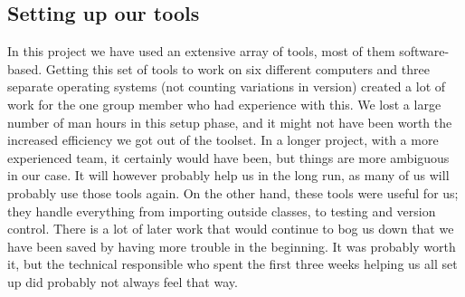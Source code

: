 \subsection{Setting up our tools}
In this project we have used an extensive array of tools, most of them software-based. Getting this set of tools to work on six different computers and three separate operating systems (not counting variations in version) created a lot of work for the one group member who had experience with this.
\newline
\newline
We lost a large number of man hours in this setup phase, and it might not have been worth the increased efficiency we got out of the toolset. In a longer project, with a more experienced team, it certainly would have been, but things are more ambiguous in our case. It will however probably help us in the long run, as many of us will probably use those tools again.
\newline
\newline
On the other hand, these tools were useful for us; they handle everything from importing outside classes, to testing and version control. There is a lot of later work that would continue to bog us down that we have been saved by having more trouble in the beginning. It was probably worth it, but the technical responsible who spent the first three weeks helping us all set up did probably not always feel that way.

